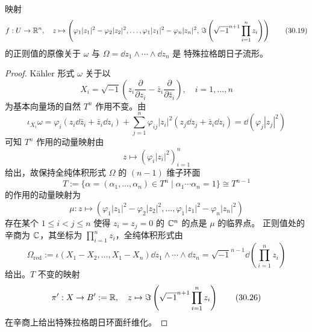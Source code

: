 \begin{corollary}
映射
\begin{equation}
  f: U \to \mathbb{R}^n, \quad
  z \mapsto \left(\varphi_1|z_1|^2 - \varphi_2|z_2|^2, \dots,
  \varphi_1|z_1|^2 - \varphi_n|z_n|^2,\,
  \Im\left(\sqrt{-1}^{n+1}\prod_{i=1}^{n}z_i\right)\right) \tag{30.19}
\end{equation}
的正则值的原像关于 $\omega$ 与 $\Omega = \dd z_1\wedge\cdots\wedge \dd z_n$ 是
特殊拉格朗日子流形。
\end{corollary}

\begin{proof}
Kähler 形式 $\omega$ 关于以
\begin{equation}
  X_i = \sqrt{-1}\left(z_i\frac{\partial}{\partial z_i}
  - \bar z_i\frac{\partial}{\partial\bar z_i}\right), \quad i = 1,\dots,n \tag{30.20}
\end{equation}
为基本向量场的自然 $T^n$ 作用不变。由
\begin{equation}
  \iota_{X_i}\omega = \varphi_i(z_i\dd\bar z_i + \bar z_i\dd z_i)
  + \sum_{j=1}^{n}\varphi_{ij}|z_i|^2(z_j\dd z_j + \bar z_i\dd z_i)
  = \dd(\varphi_j|z_j|^2) \tag{30.21}
\end{equation}
可知 $T^n$ 作用的动量映射由
\begin{equation}
  z \mapsto \left(\varphi_i|z_i|^2\right)_{i=1}^{n} \tag{30.22}
\end{equation}
给出，故保持全纯体积形式 $\Omega$ 的 $(n-1)$ 维子环面
\begin{equation}
  T := \{\alpha = (\alpha_1,\dots,\alpha_n) \in T^n \mid \alpha_1\cdots\alpha_n = 1\}
  \cong T^{n-1} \tag{30.23}
\end{equation}
的作用的动量映射为
\begin{equation}
  \mu: z \mapsto \left(\varphi_1|z_1|^2 - \varphi_2|z_2|^2, \dots,
  \varphi_1|z_1|^2 - \varphi_n|z_n|^2\right) \tag{30.24}
\end{equation}
存在某个 $1 \le i < j \le n$ 使得 $z_i = z_j = 0$ 的 $\mathbb{C}^n$ 的点是 $\mu$ 的临界点。
正则值处的辛商为 $\mathbb{C}$，其坐标为 $\prod_{i=1}^{n}z_i$，全纯体积形式由
\begin{equation}
  \Omega_{\mathrm{red}} := \iota(X_1 - X_2,\dots,X_1 - X_n)
  \dd z_1\wedge\cdots\wedge \dd z_n
  = \sqrt{-1}^{n-1}\dd\left(\prod_{i=1}^{n}z_i\right) \tag{30.25}
\end{equation}
给出。$T$ 不变的映射
\begin{equation}
  \pi': X \to B' := \mathbb{R}, \quad
  z \mapsto \Im\left(\sqrt{-1}^{n+1}\prod_{i=1}^{n}z_i\right) \tag{30.26}
\end{equation}
在辛商上给出特殊拉格朗日环面纤维化。
\end{proof}


